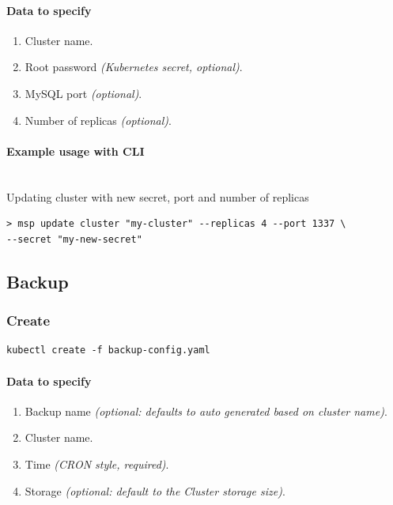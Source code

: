 \paragraph{Data to specify}
\begin{enumerate}
	\item Cluster name.
	\item Root password \textit{(Kubernetes secret, optional)}.
	\item MySQL port \textit{(optional)}.
	\item Number of replicas \textit{(optional)}.
\end{enumerate}

\paragraph{Example usage with CLI}\mbox{}\\

\noindent Updating cluster with new secret, port and number of replicas

\begin{lstlisting}
> msp update cluster "my-cluster" --replicas 4 --port 1337 \
--secret "my-new-secret"
\end{lstlisting}

\subsection{Backup}
\subsubsection*{Create}
\begin{lstlisting}
kubectl create -f backup-config.yaml
\end{lstlisting}

\paragraph{Data to specify}
\begin{enumerate}
	\item Backup name \textit{(optional: defaults to auto generated based on cluster name)}.
	\item Cluster name.
	\item Time \textit{(CRON style, required)}.
	\item Storage \textit{(optional: default to the Cluster storage size)}.
\end{enumerate}

